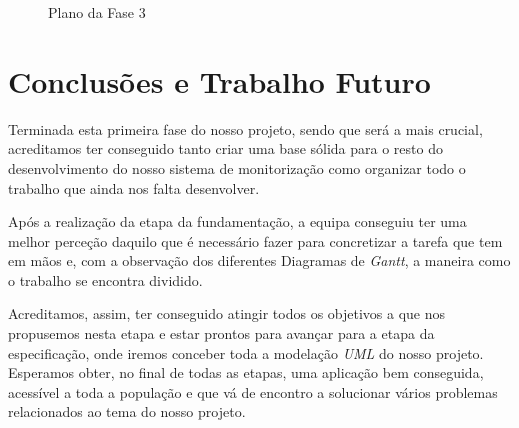 \documentclass[a4paper,12pt]{scrreprt}
\newcommand{\tab}{
    \hspace{1cm}}
\begin{document}
        \begin{figure}[hbt!]
            \centering
            \caption{Plano da Fase 3}
        \end{figure}




\chapter{Conclusões e Trabalho Futuro}
    \tab Terminada esta primeira fase do nosso projeto, sendo que será a mais crucial, acreditamos ter conseguido tanto criar uma base sólida para o resto do desenvolvimento do nosso sistema de monitorização como organizar todo o trabalho que ainda nos falta desenvolver.
    
    \tab Após a realização da etapa da fundamentação, a equipa conseguiu ter uma melhor perceção daquilo que é necessário fazer para concretizar a tarefa que tem em mãos e, com a observação dos diferentes Diagramas de \textit{Gantt}, a maneira como o trabalho se encontra dividido.
    
    \tab Acreditamos, assim, ter conseguido atingir todos os objetivos a que nos propusemos nesta etapa e estar prontos para avançar para a etapa da especificação, onde iremos conceber toda a modelação \textit{UML} do nosso projeto. Esperamos obter, no final de todas as etapas, uma aplicação bem conseguida, acessível a toda a população e que vá de encontro a solucionar vários problemas relacionados ao tema do nosso projeto.


\end{document}
